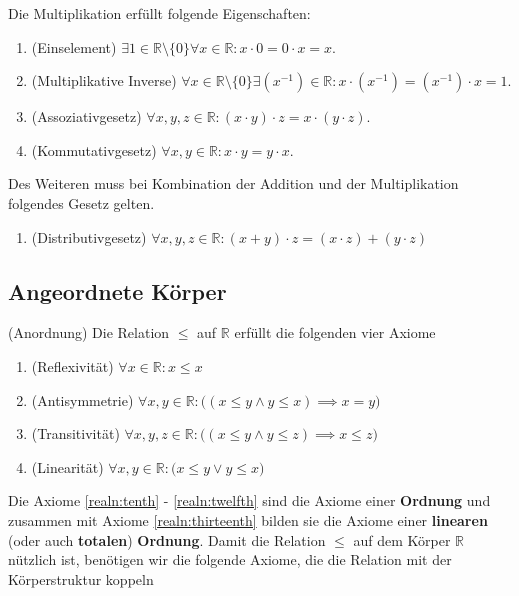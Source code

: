 \documentclass[../Analysis1_script.tex]{subfiles}
\begin{document}
\begin{remark}
	Die Multiplikation erfüllt folgende Eigenschaften:
	\begin{enumerate}[resume]
		\item \label{realn:fifth}(Einselement) $\exists{1}\in\mathbb{R}\setminus\{0\} \forall{x}\in\mathbb{R}: x \cdot 0 = 0 \cdot x = x$.
		\item \label{realn:sexth}(Multiplikative Inverse) $\forall{x}\in\mathbb{R}\setminus\{0\} \exists(x^{-1})\in\mathbb{R}: x \cdot (x^{-1}) = (x^{-1}) \cdot x = 1$.
		\item \label{realn:seventh}(Assoziativgesetz) $\forall{x, y, z} \in \mathbb{R} : (x \cdot y) \cdot z = x \cdot (y \cdot z)$.
		\item \label{realn:eighth}(Kommutativgesetz) $\forall{x, y} \in \mathbb{R} : x \cdot y = y \cdot x$.
	\end{enumerate}
	Des Weiteren muss bei Kombination der Addition und der Multiplikation folgendes Gesetz gelten.
	\begin{enumerate}[resume]
		\item \label{realn:nineth}(Distributivgesetz) $\forall{x, y, z} \in \mathbb{R}: (x + y) \cdot z = (x \cdot z) + (y \cdot z)$ 
	\end{enumerate}
\end{remark}

\subsection{Angeordnete Körper}
\begin{axiom}{(Anordnung)}
	Die Relation $\leq$ auf $\mathbb{R}$ erfüllt die folgenden vier Axiome
	\begin{enumerate}[resume]
		\item \label{realn:tenth}(Reflexivität) $\forall x \in \mathbb {R}: x \leq x$
		\item \label{realn:eleventh}(Antisymmetrie) $\forall x,y \in \mathbb {R}: \big ((x \leq y \wedge y \leq x) \implies x=y\big )$
		\item \label{realn:twelfht}(Transitivität) $\forall x,y,z \in \mathbb {R}: \big ((x\leq y\wedge y \leq z) \implies x \leq z\big )$
    	\item \label{realn:thirteenth}(Linearität) $\forall x,y \in \mathbb {R}: \big (x \leq y \vee y \leq x\big )$
	\end{enumerate}
	Die Axiome \ref{realn:tenth} - \ref{realn:twelfth} sind die Axiome einer \textbf{Ordnung} und zusammen mit Axiome \ref{realn:thirteenth} bilden sie die Axiome einer \textbf{linearen} (oder auch \textbf{totalen}) \textbf{Ordnung}. Damit die Relation $\leq$ auf dem Körper $\mathbb{R}$ nützlich ist, benötigen wir die folgende Axiome, die die Relation mit der Körperstruktur koppeln
\end{axiom}
\end{document}
